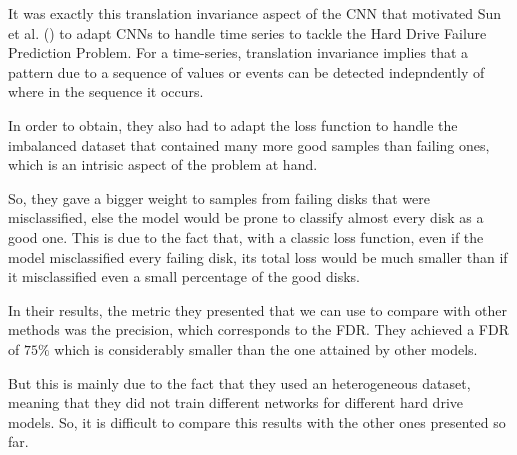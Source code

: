 It was exactly this translation invariance aspect of the CNN that motivated Sun et al. (\cite{sun2019system}) to adapt CNNs to handle time series to tackle the Hard Drive Failure Prediction Problem.
For a time-series, translation invariance implies that a pattern due to a sequence of values or events can be detected indepndently of where in the sequence it occurs.

In order to obtain, they also had to adapt the loss function to handle the imbalanced dataset that contained many more good samples than failing ones, which is an intrisic aspect of the problem at hand.

So, they gave a bigger weight to samples from failing disks that were misclassified, else the model would be prone to classify almost every disk as a good one.
This is due to the fact that, with a classic loss function, even if the model misclassified every failing disk, its total loss would be much smaller than if it misclassified even a small percentage of the good disks.

In their results, the metric they presented that we can use to compare with other methods was the precision, which corresponds to the FDR.
They achieved a FDR of $75\%$ which is considerably smaller than the one attained by other models.

But this is mainly due to the fact that they used an heterogeneous dataset, meaning that they did not train different networks for different hard drive models.
So, it is difficult to compare this results with the other ones presented so far.